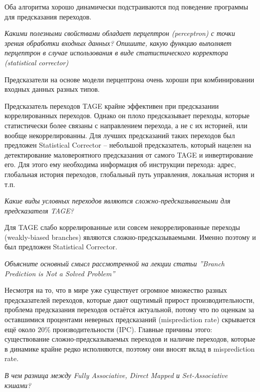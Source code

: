 	Оба алгоритма хорошо динамически подстраиваются под поведение программы для предсказания переходов.
	
	\textit{Какими полезными свойствами обладает перцептрон (perceptron) с точки зрения обработки входных данных? Опишите, какую функцию выполняет перцептрон в случае использования в виде статистического корректора (statistical corrector)}
	
	Предсказатели на основе модели перцептрона очень хороши при комбинировании входных данных разных типов.
	
	Предсказатель переходов TAGE крайне эффективен при предсказании коррелированных переходов. Однако он плохо предсказывает переходы, которые статистически более связаны с направлением перехода, а не с их историей, или вообще некоррелированны. Для лучших предсказаний таких переходов был предложен Statistical Corrector -- небольшой предсказатель, который нацелен на детектирование маловероятного предсказания от самого TAGE и инвертирование его. Для этого ему необходима информация об инструкции перехода: адрес, глобальная история переходов, глобальный путь управления, локальная история и т.п.
	
	\textit{Какие виды условных переходов являются сложно-предсказываемыми для предсказателя TAGE?}
	
	Для TAGE слабо коррелированные или совсем некоррелированные переходы (weakly-biased branches) являются сложно-предсказываемыми. Именно поэтому и был предложен Statistical Corrector.
	
	\textit{Объясните основный смысл рассмотренной на лекции статьи ''Branch Prediction is Not a Solved Problem''}
	
	Несмотря на то, что в мире уже существует огромное множество разных предсказателей переходов, которые дают ощутимый прирост производительности, проблема предсказания переходов остаётся актуальной, потому что по оценкам за оставшимися процентами неверных предсказаний (misprediction rate) скрывается ещё около $20\%$ производительности (IPC). Главные причины этого: существование сложно-предсказываемых переходов и наличие переходов, которые в динамике крайне редко исполняются, поэтому они вносят вклад в misprediction rate.
	
	
	\newpage
	
	\textit{В чем разница между Fully Associative, Direct Mapped и Set-Associative кэшами?}
	
